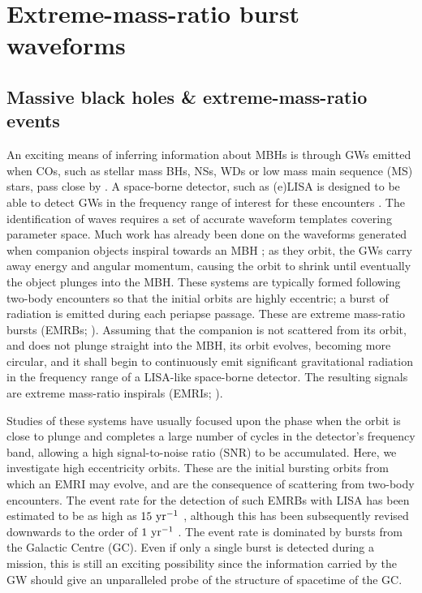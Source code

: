 \chapter{Extreme-mass-ratio burst waveforms\label{ch:waveforms}}

\section{Massive black holes \& extreme-mass-ratio events}

An exciting means of inferring information about MBHs is through GWs emitted when COs, such as stellar mass BHs, NSs, WDs or low mass main sequence (MS) stars, pass close by \citep{Sathyaprakash2009}. A space-borne detector, such as (e)LISA is designed to be able to detect GWs in the frequency range of interest for these encounters \citep{Danzmann2003, Jennrich2011, Amaro-Seoane2012a}. The identification of waves requires a set of accurate waveform templates covering parameter space. Much work has already been done on the waveforms generated when companion objects inspiral towards an MBH \citep{Glampedakis2005, Barack2009}; as they orbit, the GWs carry away energy and angular momentum, causing the orbit to shrink until eventually the object plunges into the MBH. These systems are typically formed following two-body encounters so that the initial orbits are highly eccentric; a burst of radiation is emitted during each periapse passage. These are extreme mass-ratio bursts (EMRBs; \citealt{Rubbo2006}). Assuming that the companion is not scattered from its orbit, and does not plunge straight into the MBH, its orbit evolves, becoming more circular, and it shall begin to continuously emit significant gravitational radiation in the frequency range of a LISA-like space-borne detector. The resulting signals are extreme mass-ratio inspirals (EMRIs; \citealt{Amaro-Seoane2007}).

Studies of these systems have usually focused upon the phase when the orbit is close to plunge and completes a large number of cycles in the detector's frequency band, allowing a high signal-to-noise ratio (SNR) to be accumulated. Here, we investigate high eccentricity orbits. These are the initial bursting orbits from which an EMRI may evolve, and are the consequence of scattering from two-body encounters. The event rate for the detection of such EMRBs with LISA has been estimated to be as high as $15~\mathrm{yr^{-1}}$ \citep{Rubbo2006}, although this has been subsequently revised downwards to the order of $1~\mathrm{yr^{-1}}$ \citep{Hopman2007}. The event rate is dominated by bursts from the Galactic Centre (GC). Even if only a single burst is detected during a mission, this is still an exciting possibility since the information carried by the GW should give an unparalleled probe of the structure of spacetime of the GC.

